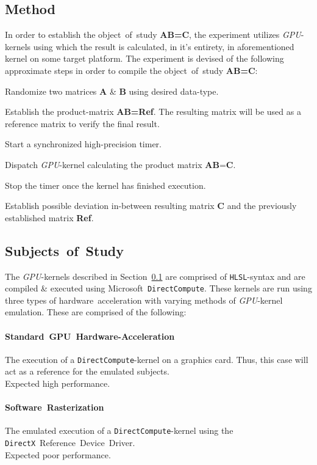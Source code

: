 \documentclass[fleqn,10pt]{SelfArx} %
\begin{document}
\subsection{Method}
\label{sec:contribution:method}
In order to establish the object~of~study \textbf{AB=C}, the experiment utilizes \textit{GPU}-kernels using which the result is calculated, in it’s entirety, in aforementioned kernel on some target platform. The experiment is devised of the following approximate steps in order to compile the object~of~study \textbf{AB=C}:
\begin{enumerate*}
	\item Randomize two matrices \textbf{A} \& \textbf{B} using desired data-type.
	\item Establish the product-matrix \textbf{AB=Ref}. The resulting matrix will be used as a reference matrix to verify the final result.
	\item Start a synchronized high-precision timer.
	\item Dispatch \textit{GPU}-kernel calculating the product matrix \textbf{A}\textbf{B}=\textbf{C}.
	\item Stop the timer once the kernel has finished execution.
	\item Establish possible deviation in-between resulting matrix \textbf{C} and the previously established matrix \textbf{Ref}.
\end{enumerate*}

\subsection{Subjects~of~Study}
\label{sec:contribution:subjectofstudy}
The \textit{GPU}-kernels described in Section~\ref{sec:contribution:method} are comprised of \texttt{HLSL}-syntax and are compiled \& executed using Microsoft~\texttt{DirectCompute}. These kernels are run using three types of hardware~acceleration with varying methods of \textit{GPU}-kernel emulation. These are comprised of the following:
\paragraph{Standard~GPU~Hardware-Acceleration}
	The execution of a \texttt{DirectCompute}-kernel on a graphics card. Thus, this case will act as a reference for the emulated subjects.\\
	Expected high performance.
\paragraph{Software~Rasterization}
	The emulated execution of a \texttt{DirectCompute}-kernel using the \texttt{DirectX}~Reference~Device~Driver.\\
	Expected poor performance.
\end{document}
